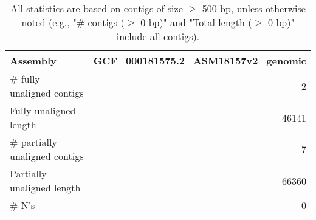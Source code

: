 \documentclass[12pt,a4paper]{article}
\begin{document}
\begin{table}[ht]
\begin{center}
\caption{All statistics are based on contigs of size $\geq$ 500 bp, unless otherwise noted (e.g., "\# contigs ($\geq$ 0 bp)" and "Total length ($\geq$ 0 bp)" include all contigs).}
\begin{tabular}{|l*{1}{|r}|}
\hline
Assembly & GCF\_000181575.2\_ASM18157v2\_genomic \\ \hline
\# fully unaligned contigs & 2 \\ \hline
Fully unaligned length & 46141 \\ \hline
\# partially unaligned contigs & 7 \\ \hline
Partially unaligned length & 66360 \\ \hline
\# N's & 0 \\ \hline
\end{tabular}
\end{center}
\end{table}
\end{document}
